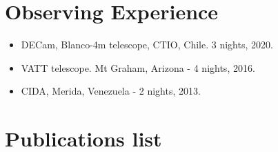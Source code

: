 \documentclass[UTF8]{article}
\begin{document}
\section*{Observing Experience}
\begin{itemize}
  \setlength\itemsep{0.0em}
  \renewcommand\labelitemi{$\cdot$}
\item DECam, Blanco-4m telescope, CTIO, Chile. 3 nights, 2020.
\item VATT telescope. Mt Graham, Arizona - 4 nights, 2016.
\item CIDA, Merida, Venezuela - 2 nights, 2013.
\end{itemize}

\section*{Publications list}
\end{document}
